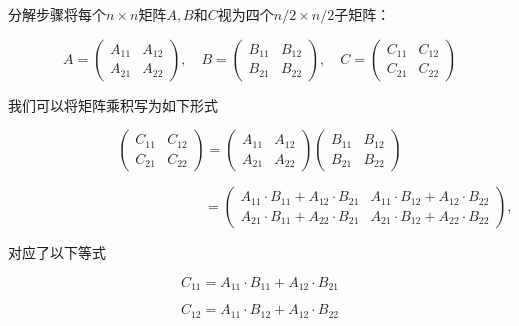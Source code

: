 \documentclass[lang=cn,newtx,10pt,scheme=chinese]{elegantbook}
\begin{document}
分解步骤将每个$n \times n$矩阵$A, B$和$C$视为四个$n / 2 \times n / 2$子矩阵：

\begin{equation}
A=(\begin{array}{ll}
A_{11} & A_{12} \\
A_{21} & A_{22}
\end{array}), \quad B=(\begin{array}{ll}
B_{11} & B_{12} \\
B_{21} & B_{22}
\end{array}), \quad C=(\begin{array}{ll}
C_{11} & C_{12} \\
C_{21} & C_{22}
\end{array})
\end{equation}

我们可以将矩阵乘积写为如下形式

\begin{equation}
(\begin{array}{ll}
C_{11} & C_{12} \\
C_{21} & C_{22}
\end{array})=(\begin{array}{ll}
A_{11} & A_{12} \\
A_{21} & A_{22}
\end{array})(\begin{array}{ll}
B_{11} & B_{12} \\
B_{21} & B_{22}
\end{array})
\end{equation}

\begin{equation}
\quad\quad\quad\quad\quad\quad\quad\quad\quad\quad\quad\quad\quad\quad
=(\begin{array}{cc}
A_{11} \cdot B_{11}+A_{12} \cdot B_{21} & A_{11} \cdot B_{12}+A_{12} \cdot B_{22} \\
A_{21} \cdot B_{11}+A_{22} \cdot B_{21} & A_{21} \cdot B_{12}+A_{22} \cdot B_{22}
\end{array}),
\end{equation}

对应了以下等式

\begin{equation}
C_{11}=A_{11} \cdot B_{11}+A_{12} \cdot B_{21}
\end{equation}

\begin{equation}
C_{12}=A_{11} \cdot B_{12}+A_{12} \cdot B_{22}
\end{equation}
\end{document}
